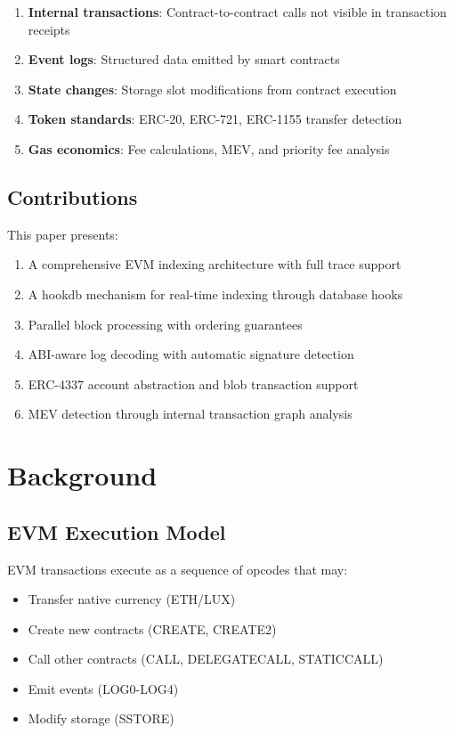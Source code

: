 \documentclass[11pt,twocolumn]{article}
\begin{document}
\begin{enumerate}
\item \textbf{Internal transactions}: Contract-to-contract calls not visible in transaction receipts
\item \textbf{Event logs}: Structured data emitted by smart contracts
\item \textbf{State changes}: Storage slot modifications from contract execution
\item \textbf{Token standards}: ERC-20, ERC-721, ERC-1155 transfer detection
\item \textbf{Gas economics}: Fee calculations, MEV, and priority fee analysis
\end{enumerate}

\subsection{Contributions}

This paper presents:

\begin{enumerate}
\item A comprehensive EVM indexing architecture with full trace support
\item A hookdb mechanism for real-time indexing through database hooks
\item Parallel block processing with ordering guarantees
\item ABI-aware log decoding with automatic signature detection
\item ERC-4337 account abstraction and blob transaction support
\item MEV detection through internal transaction graph analysis
\end{enumerate}

\section{Background}

\subsection{EVM Execution Model}

EVM transactions execute as a sequence of opcodes that may:

\begin{itemize}
\item Transfer native currency (ETH/LUX)
\item Create new contracts (CREATE, CREATE2)
\item Call other contracts (CALL, DELEGATECALL, STATICCALL)
\item Emit events (LOG0-LOG4)
\item Modify storage (SSTORE)
\end{itemize}
\end{document}
